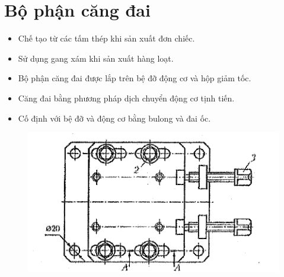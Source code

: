 \section{Bộ phận căng đai}
\begin{itemize}
    \item Chế tạo từ các tấm thép khi sản xuất đơn chiếc.
    \item Sử dụng gang xám khi sản xuất hàng loạt.
    \item Bộ phận căng đai được lắp trên bệ đỡ động cơ và hộp giảm tốc.
    \item Căng đai bằng phương pháp dịch chuyển động cơ tịnh tiến.
    \item Cố định với bệ đỡ và động cơ bằng bulong và đai ốc.
\end{itemize}
\begin{figure}[H]
    \centering
    \includegraphics[width=1\textwidth]{pictures/cangdai.png}
\end{figure}